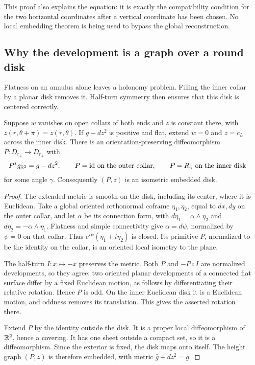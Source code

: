 This proof also explains the equation: it is exactly the compatibility
condition for the two horizontal coordinates after a vertical
coordinate has been chosen. No local embedding theorem is being
used to bypass the global reconstruction.

\subsection{Why the development is a graph over a round disk}

Flatness on an annulus alone leaves a holonomy problem. Filling the
inner collar by a planar disk removes it. Half-turn symmetry then
ensures that this disk is centered correctly.

\begin{proposition}\label{lem:disk-development}
Suppose $w$ vanishes on open collars of both ends and $z$ is constant
there, with $z(r,\theta+\pi)=z(r,\theta)$. If $g-dz^2$ is positive
and flat, extend $w=0$ and $z=c_L$ across the inner disk. There is an
orientation-preserving diffeomorphism
$P:D_{r_+}\longrightarrow D_{r_+}$ with
\[
 P^*g_{\mathbb R^2}=g-dz^2,
 \qquad P=\mathrm{id}\text{ on the outer collar},
 \qquad P=R_\gamma\text{ on the inner disk}
\]
for some angle $\gamma$. Consequently $(P,z)$ is an isometric
embedded disk.
\end{proposition}

\begin{proof}
The extended metric is smooth on the disk, including its center,
where it is Euclidean. Take a global oriented orthonormal coframe
$\eta_1,\eta_2$, equal to $dx,dy$ on the outer collar, and let $\alpha$
be its connection form, with
$d\eta_1=\alpha\wedge\eta_2$ and
$d\eta_2=-\alpha\wedge\eta_1$. Flatness and simple connectivity
give $\alpha=d\psi$, normalized by $\psi=0$ on that collar. Thus
$e^{i\psi}(\eta_1+i\eta_2)$ is closed. Its primitive $P$, normalized
to be the identity on the collar, is an oriented local isometry to
the plane.

The half-turn $I:x\mapsto-x$ preserves the metric.
Both $P$ and $-P\circ I$ are normalized developments, so they agree:
two oriented planar developments of a connected flat surface differ
by a fixed Euclidean motion, as follows by differentiating their
relative rotation. Hence $P$ is odd. On the inner Euclidean disk it
is a Euclidean motion, and oddness removes its translation. This
gives the asserted rotation there.

Extend $P$ by the identity outside the disk. It is a proper local
diffeomorphism of $\mathbb R^2$, hence a covering. It has one sheet outside
a compact set, so it is a diffeomorphism. Since the exterior is
fixed, the disk maps onto itself. The height graph $(P,z)$ is
therefore embedded, with metric $\bar g+dz^2=g$.
\end{proof}

